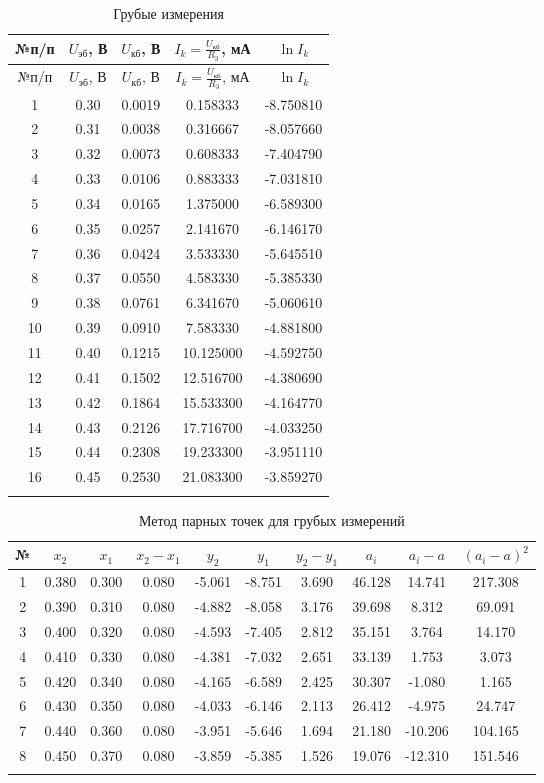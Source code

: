 \begin{longtable}{|c|c|c|c|c|}
\hline
№п/п & $U_{\text{эб}}$, В & $U_{\text{кб}}$, В & $I_k = \frac{U_{\text{кб}}}{R_3}$, мА & $\ln I_k$ \\
\hline
\endfirsthead
\hline
№п/п & $U_{эб}$, В & $U_{кб}$, В & $I_k = \frac{U_{кб}}{R_3}$, мА & $\ln I_k$ \\
\hline
\endhead
\hline
1 & 0.30 & 0.0019 & 0.158333 & -8.750810 \\
2 & 0.31 & 0.0038 & 0.316667 & -8.057660 \\
3 & 0.32 & 0.0073 & 0.608333 & -7.404790 \\
4 & 0.33 & 0.0106 & 0.883333 & -7.031810 \\
5 & 0.34 & 0.0165 & 1.375000 & -6.589300 \\
6 & 0.35 & 0.0257 & 2.141670 & -6.146170 \\
7 & 0.36 & 0.0424 & 3.533330 & -5.645510 \\
8 & 0.37 & 0.0550 & 4.583330 & -5.385330 \\
9 & 0.38 & 0.0761 & 6.341670 & -5.060610 \\
10 & 0.39 & 0.0910 & 7.583330 & -4.881800 \\
11 & 0.40 & 0.1215 & 10.125000 & -4.592750 \\
12 & 0.41 & 0.1502 & 12.516700 & -4.380690 \\
13 & 0.42 & 0.1864 & 15.533300 & -4.164770 \\
14 & 0.43 & 0.2126 & 17.716700 & -4.033250 \\
15 & 0.44 & 0.2308 & 19.233300 & -3.951110 \\
16 & 0.45 & 0.2530 & 21.083300 & -3.859270 \\
\hline
\caption{Грубые измерения}
\end{longtable}

\begin{longtable}{|c|c|c|c|c|c|c|c|c|c|}
\hline
№ & $x_2$ & $x_1$ & $x_2 - x_1$ & $y_2$ & $y_1$ & $y_2 - y_1$ & $a_i$ & $a_i - a$ & $(a_i - a)^2$ \\
\hline
\endhead
\hline
1 & 0.380 & 0.300 & 0.080 & -5.061 & -8.751 & 3.690 & 46.128 & 14.741 & 217.308 \\
2 & 0.390 & 0.310 & 0.080 & -4.882 & -8.058 & 3.176 & 39.698 & 8.312 & 69.091 \\
3 & 0.400 & 0.320 & 0.080 & -4.593 & -7.405 & 2.812 & 35.151 & 3.764 & 14.170 \\
4 & 0.410 & 0.330 & 0.080 & -4.381 & -7.032 & 2.651 & 33.139 & 1.753 & 3.073 \\
5 & 0.420 & 0.340 & 0.080 & -4.165 & -6.589 & 2.425 & 30.307 & -1.080 & 1.165 \\
6 & 0.430 & 0.350 & 0.080 & -4.033 & -6.146 & 2.113 & 26.412 & -4.975 & 24.747 \\
7 & 0.440 & 0.360 & 0.080 & -3.951 & -5.646 & 1.694 & 21.180 & -10.206 & 104.165 \\
8 & 0.450 & 0.370 & 0.080 & -3.859 & -5.385 & 1.526 & 19.076 & -12.310 & 151.546 \\
\hline
\caption{Метод парных точек для грубых измерений}
\end{longtable}

